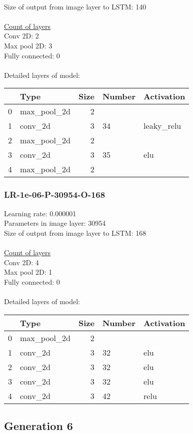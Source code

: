 \\Size of output from image layer to LSTM: 140
\\\\\underline{Count of layers} 
\\Conv 2D:           2\\Max pool 2D:      3\\Fully connected:  0
\\\\Detailed layers of model: \\\begin{tabular}{rlrll}
\hline
    & Type        &   Size & Number   & Activation   \\
\hline
  0 & max\_pool\_2d &      2 &          &              \\
  1 & conv\_2d     &      3 & 34       & leaky\_relu   \\
  2 & max\_pool\_2d &      2 &          &              \\
  3 & conv\_2d     &      3 & 35       & elu          \\
  4 & max\_pool\_2d &      2 &          &              \\
\hline
\end{tabular}\subsubsection*{LR-1e-06-P-30954-O-168}
Learning rate: 0.000001
\\Parameters in image layer: 30954
\\Size of output from image layer to LSTM: 168
\\\\\underline{Count of layers} 
\\Conv 2D:           4\\Max pool 2D:      1\\Fully connected:  0
\\\\Detailed layers of model: \\\begin{tabular}{rlrll}
\hline
    & Type        &   Size & Number   & Activation   \\
\hline
  0 & max\_pool\_2d &      2 &          &              \\
  1 & conv\_2d     &      3 & 32       & elu          \\
  2 & conv\_2d     &      3 & 32       & elu          \\
  3 & conv\_2d     &      3 & 32       & elu          \\
  4 & conv\_2d     &      3 & 42       & relu         \\
\hline
\end{tabular}\subsection{Generation 6}
